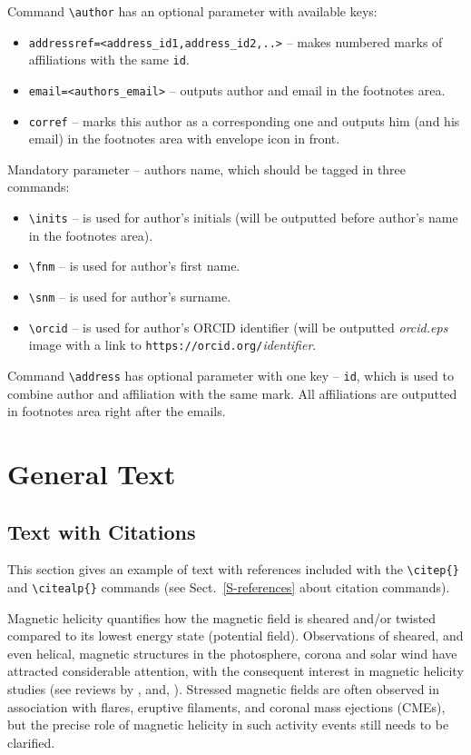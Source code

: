 \documentclass[namedreferences,hyperref,optionalrh]{spr-sola}
\begin{document}
Command \verb+\author+  has an optional parameter with available keys: 
\begin{itemize}
\item \verb+addressref=<address_id1,address_id2,..>+ -- makes numbered marks of affiliations with the same \texttt{id}.
\item \verb+email=<authors_email>+ -- outputs author and email in the footnotes area.
\item \verb+corref+ -- marks this author as a corresponding one and outputs him (and his email) in the footnotes area with envelope icon in front. 
\end{itemize}
Mandatory parameter -- authors name, which should be tagged in three commands:
\begin{itemize}
\item \verb+\inits+ -- is used for author's initials (will be outputted before author's name in the footnotes area).
\item \verb+\fnm+ -- is used for author's first name.
\item \verb+\snm+ -- is used for author's surname.
\item \verb+\orcid+ -- is used for author's ORCID identifier (will be outputted \textit{orcid.eps} image with a link to \verb+https://orcid.org/+\textit{identifier}.
\end{itemize}

Command \verb+\address+ has optional parameter  with one key -- \texttt{id}, which is used to combine author and affiliation with the same mark.
All affiliations are outputted in footnotes area right after the emails.
 
\section{General Text} %
      \label{S-general}      

\subsection{Text with Citations} %
  \label{S-text}
This section gives an example of text with references 
included with the \verb+\citep{}+ and \verb+\citealp{}+ commands
(see Sect.~\ref{S-references} about citation commands).

Magnetic helicity quantifies how the magnetic field is sheared
and/or twisted compared to its lowest energy state (potential
field). Observations of sheared, and even helical, magnetic
structures in the photosphere, corona and solar wind have
attracted considerable attention, with the consequent interest in
magnetic helicity studies (see reviews by \citealp{Brown99}, and,
\citealp{Berger03}). Stressed magnetic fields are often observed
in association with flares, eruptive filaments, and coronal mass
ejections (CMEs), but the precise role of magnetic helicity in
such activity events still needs to be clarified.
\end{document}

